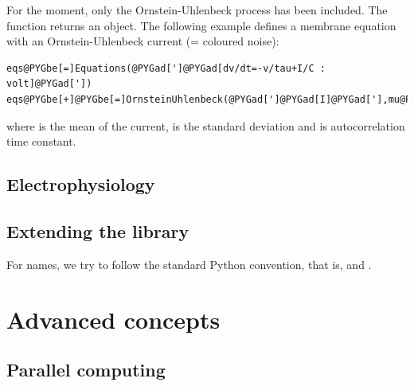 \documentclass[letterpaper,10pt]{manual}
\begin{document}
For the moment, only the Ornstein-Uhlenbeck process has been included.
The function  returns an \hyperlink{brian.Equations}{} object. The following example
defines a membrane equation with an Ornstein-Uhlenbeck current  (= coloured noise):

\begin{Verbatim}[commandchars=@\[\]]
eqs@PYGbe[=]Equations(@PYGad[']@PYGad[dv/dt=-v/tau+I/C : volt]@PYGad['])
eqs@PYGbe[+]@PYGbe[=]OrnsteinUhlenbeck(@PYGad[']@PYGad[I]@PYGad['],mu@PYGbe[=]@PYGaw[1]@PYGbe[*]nA,sigma@PYGbe[=]@PYGaw[2]@PYGbe[*]nA,tau@PYGbe[=]@PYGaw[10]@PYGbe[*]ms)
\end{Verbatim}

where  is the mean of the current,  is the standard deviation and
 is autocorrelation time constant.

\resetcurrentobjects


\section{Electrophysiology}

\resetcurrentobjects


\section{Extending the library}

For names, we try to follow the standard Python convention, that is, 
and .

\resetcurrentobjects


\chapter{Advanced concepts}

\resetcurrentobjects
{}

\hypertarget{index-62}{}\section{Parallel computing}
\end{document}
